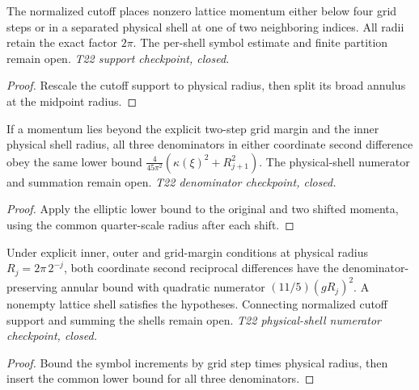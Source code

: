 \begin{lemma}
  \label{lem:normalized-cutoff-shell}
  \leanok
  The normalized cutoff places nonzero lattice momentum either below four
  grid steps or in a separated physical shell at one of two neighboring
  indices. All radii retain the exact factor $2\pi$. The per-shell symbol
  estimate and finite partition remain open. \emph{T22 support checkpoint, closed.}
\end{lemma}
\begin{proof}\leanok
  Rescale the cutoff support to physical radius, then split its broad annulus
  at the midpoint radius.
\end{proof}

\begin{lemma}
  \label{lem:physical-shell-denominator}
  \leanok
  If a momentum lies beyond the explicit two-step grid margin and the inner
  physical shell radius, all three denominators in either coordinate second
  difference obey the same lower bound
  $\frac{4}{45\pi^2}(\kappa(\xi)^2+R_{j+1}^2)$.
  The physical-shell numerator and summation remain open.
  \emph{T22 denominator checkpoint, closed.}
\end{lemma}
\begin{proof}\leanok
  Apply the elliptic lower bound to the original and two shifted momenta,
  using the common quarter-scale radius after each shift.
\end{proof}

\begin{lemma}
  \label{lem:physical-shell-numerator}
  \leanok
  Under explicit inner, outer and grid-margin conditions at physical radius
  $R_j=2\pi\,2^{-j}$, both coordinate second reciprocal differences have
  the denominator-preserving annular bound with quadratic numerator
  $(11/5)(gR_j)^2$. A nonempty lattice shell satisfies the hypotheses.
  Connecting normalized cutoff support and summing the shells remain open.
  \emph{T22 physical-shell numerator checkpoint, closed.}
\end{lemma}
\begin{proof}\leanok
  Bound the symbol increments by grid step times physical radius, then insert
  the common lower bound for all three denominators.
\end{proof}

